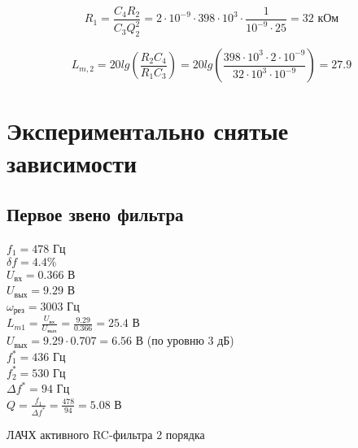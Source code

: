 \begin{displaymath}
	R_1 = \frac{C_4 R_2}{C_3 Q_2^2} = 2 \cdot 10^{-9} \cdot 398 \cdot 10^3 \cdot \frac{1}{10^{-9} \cdot 25} = 32 \text{ кОм}
\end{displaymath}

\begin{displaymath}
	L_{m,2} = 20 lg \left( \frac{R_2 C_4}{R_1 C_3} \right) = 20 lg \left( \frac{398 \cdot 10^3 \cdot 2 \cdot 10^{-9}}{32 \cdot 10^3 \cdot 10^{-9}} \right) = 27.9
\end{displaymath}

\section{Экспериментально снятые зависимости}

\subsection{Первое звено фильтра}

\noindent $f_1 = 478$ Гц \\
$\delta f = 4.4 \%$ \\
$U_\text{вх} = 0.366$ В \\
$U_\text{вых} = 9.29$ В \\
$\omega_\text{рез} = 3003$ Гц \\
$L_{m1} = \frac{U_{\text{вх}}}{U_{\text{вых}}} = \frac{9.29}{0.366} = 25.4$ В \\

\noindent $U_{\text{вых}} = 9.29 \cdot 0.707 = 6.56$ В (по уровню 3 дБ)\\
$f_1^* = 436$ Гц \\
$f_2^* = 530$ Гц \\
$\Delta f^* = 94$ Гц \\
$Q = \frac{f_1}{\Delta f^*} = \frac{478}{94} = 5.08$ В \\

\begin{table}[H]
\begin{center}
	\caption{ЛАЧХ активного RC-фильтра 2 порядка}
	\label{tab:diff-int}
	\def\tabcolsep{20pt}
\end{center}
\end{table}

